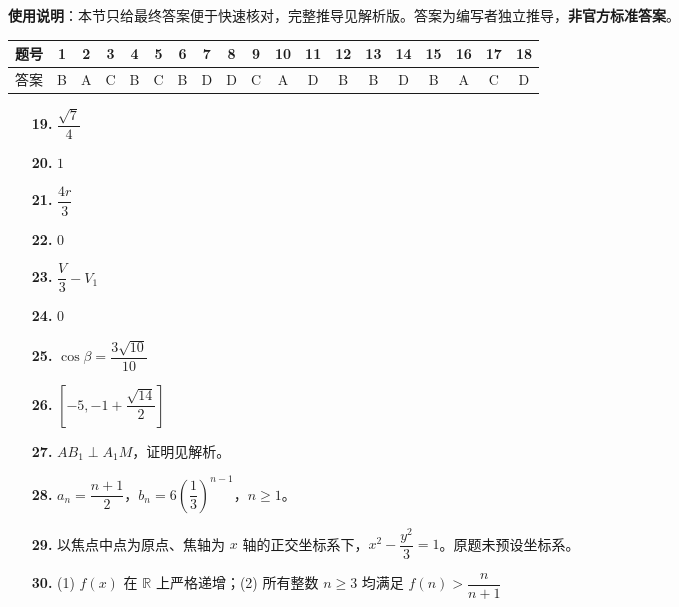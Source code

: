 
\begin{gknotice}
\textbf{使用说明}：本节只给最终答案便于快速核对，完整推导见解析版。答案为编写者独立推导，\textbf{非官方标准答案}。
\end{gknotice}

\begin{center}\begin{tabular}{ccccccccccccccccccc}
\toprule
题号 & 1 & 2 & 3 & 4 & 5 & 6 & 7 & 8 & 9 & 10 & 11 & 12 & 13 & 14 & 15 & 16 & 17 & 18 \\
\midrule
答案 & B & A & C & B & C & B & D & D & C & A & D & B & B & D & B & A & C & D \\
\bottomrule
\end{tabular}\end{center}

\begin{itemize}[leftmargin=2.6em]
  \item[\textbf{19.}] $\dfrac{\sqrt7}4$
  \item[\textbf{20.}] $1$
  \item[\textbf{21.}] $\dfrac{4r}3$
  \item[\textbf{22.}] $0$
  \item[\textbf{23.}] $\dfrac V3-V_1$
  \item[\textbf{24.}] $0$
\end{itemize}

\begin{itemize}[leftmargin=2.6em]
  \item[\textbf{25.}] $\cos\beta=\dfrac{3\sqrt{10}}{10}$
  \item[\textbf{26.}] $\left[-5,-1+\dfrac{\sqrt{14}}2\right]$
  \item[\textbf{27.}] $AB_1\perp A_1M$，证明见解析。
  \item[\textbf{28.}] $a_n=\dfrac{n+1}2$，$b_n=6\left(\dfrac13\right)^{n-1}$，$n\ge1$。
  \item[\textbf{29.}] 以焦点中点为原点、焦轴为 $x$ 轴的正交坐标系下，$x^2-\dfrac{y^2}3=1$。原题未预设坐标系。
  \item[\textbf{30.}] (1) $f(x)$ 在 $\mathbb R$ 上严格递增；(2) 所有整数 $n\ge3$ 均满足 $f(n)>\dfrac n{n+1}$
\end{itemize}
